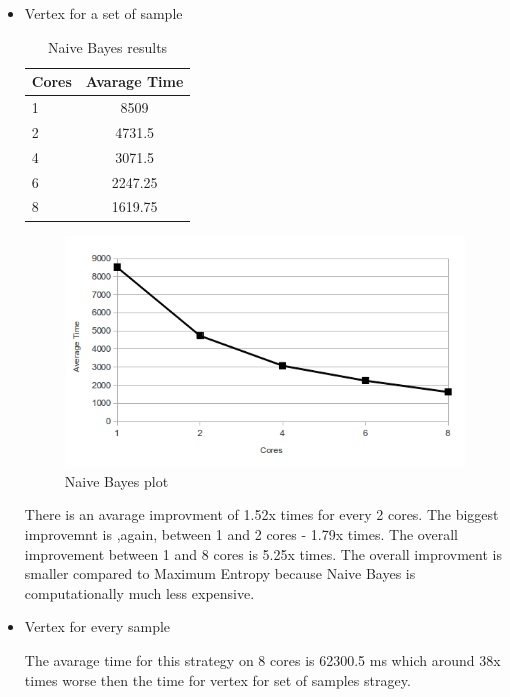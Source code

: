 \documentclass{report}
\begin{document}
\begin{itemize}

\item{Vertex for a set of sample}

\begin{table}[ht]
\centering
\begin{tabular}{ l c }
    \hline\hline
    Cores & Avarage Time \\ [0.2ex]
    \hline
    1 & 8509 \\
    2 & 4731.5  \\
    4 & 3071.5  \\
    6 & 2247.25  \\
    8 & 1619.75  \\
    \hline
  \end{tabular}
\label{table:naiveres1}
\caption{Naive Bayes results}
\end{table}

\begin{figure}[!htb]
  \centering
  \includegraphics*[scale=0.70]{naivebayes_plot.png}
  \caption{Naive Bayes plot}
  \label{fig:naive_plot}
\end{figure}

There is an avarage improvment of 1.52x times for every 2 cores. The biggest improvemnt is ,again, between 1 and 2 cores - 1.79x times. The overall improvement between 1 and 8 cores is 5.25x times. The overall improvment is smaller compared to Maximum Entropy because Naive Bayes is computationally much less expensive.

\item{Vertex for every sample}

The avarage time for this strategy on 8 cores is 62300.5 ms which around 38x times worse then the time for vertex for set of samples stragey.


\end{itemize}
\end{document}
